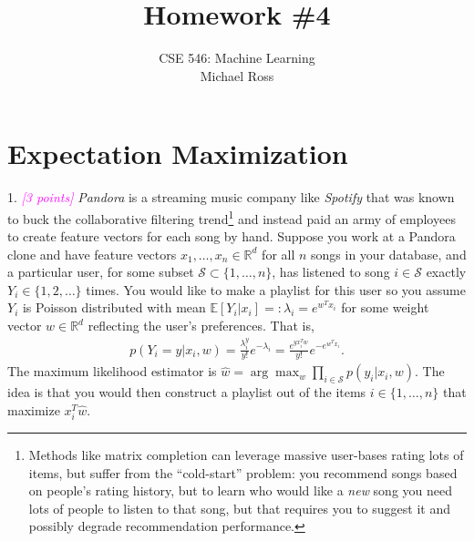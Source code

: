 \documentclass{article}
\date{{}}
\newcommand{\field}[1]{\mathbb{#1}}
\newcommand{\1}{\mathbf{1}}
\newcommand{\E}{\mathbb{E}} %
\newcommand{\R}{\field{R}} %
\newcommand{\grade}[1]{\small\textcolor{magenta}{\emph{[#1 points]}} \normalsize}
\begin{document}
\title{Homework \#4}
\author{\normalsize{CSE 546: Machine Learning}\\
\normalsize{Michael Ross} }
\maketitle


\section*{Expectation Maximization}
1. \grade{3} \emph{Pandora} is a streaming music company like \emph{Spotify} that was known to buck the collaborative filtering trend\footnote{Methods like matrix completion can leverage massive user-bases rating lots of items, but suffer from the ``cold-start'' problem: you recommend songs based on people's rating history, but to learn who would like a \emph{new} song you need lots of people to listen to that song, but that requires you to suggest it and possibly degrade recommendation performance.} and instead paid an army of employees to create feature vectors for each song by hand. Suppose you work at a Pandora clone and have feature vectors $x_1,\dots,x_n \in \R^d$ for all $n$ songs in your database, and a particular user, for some subset $\mathcal{S} \subset \{1,\dots,n\}$, has listened to song $i \in \mathcal{S}$ exactly $Y_i \in \{1,2,\dots\}$ times. 
You would like to make a playlist for this user so you assume $Y_i$ is Poisson distributed with mean $\E[Y_i | x_i] =: \lambda_i = e^{w^{T} x_i}$ for some weight vector $w \in \R^d$ reflecting the user's preferences. 
That is,
\begin{align*}
p(Y_i=y | x_i, w) = \frac{\lambda_i^y}{y!} e^{-\lambda_i} = \frac{e^{y x_i^T w}}{y!} e^{-e^{w^T x_i}}.
\end{align*}
The maximum likelihood estimator is $\widehat{w} = \arg\max_w \prod_{i \in \mathcal{S}} p(y_i | x_i, w)$.
The idea is that you would then construct a playlist out of the items $i \in \{1,\dots,n\}$ that maximize $x_i^T \widehat{w}$. 
\end{document}
